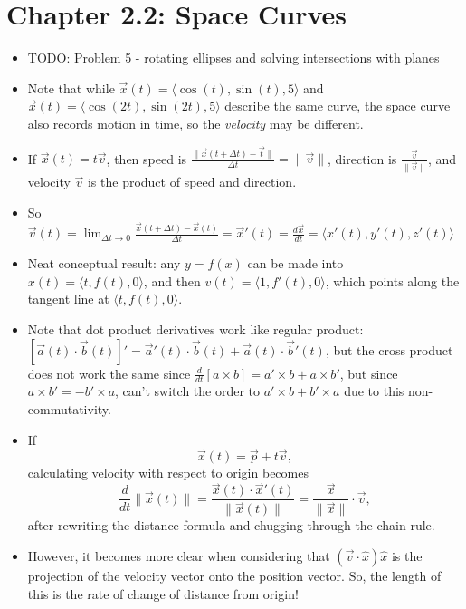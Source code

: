 \documentclass[11pt, oneside]{article}   	%
\begin{document}
\section{Chapter 2.2: Space Curves}
\begin{itemize}
\item TODO: Problem 5 - rotating ellipses and solving intersections with planes
\item Note that while $\overrightarrow{x}(t) = \langle \cos(t), \sin(t), 5 \rangle$ and  $\overrightarrow{x}(t) = \langle \cos(2t), \sin(2t), 5 \rangle$ describe the same curve, the space curve also records motion in time, so the \emph{velocity} may be different.
\item If $\overrightarrow{x}(t) = t\overrightarrow{v}$, then speed is $\frac{\| \overrightarrow{x}(t+\Delta t) - \overrightarrow{t} \|}{\Delta t} = \| \overrightarrow{v} \|$,  direction is $\frac{\overrightarrow{v}}{\| \overrightarrow{v} \|}$, and velocity $\overrightarrow{v}$ is the product of speed and direction.
\item So $\overrightarrow{v}(t) = \lim_{\Delta t \rightarrow 0} \frac{\overrightarrow{x}(t + \Delta t) - \overrightarrow{x}(t)}{\Delta t} = \overrightarrow{x}'(t) = \frac{d\overrightarrow{x}}{dt} = \langle x'(t), y'(t), z'(t) \rangle$
\item Neat conceptual result: any $y = f(x)$ can be made into $x(t) = \langle t, f(t), 0 \rangle$, and then $v(t) = \langle 1, f'(t), 0 \rangle$, which points along the tangent line at $\langle t, f(t), 0 \rangle$.
\item Note that dot product derivatives work like regular product: $[\overrightarrow{a}(t) \cdot \overrightarrow{b}(t)]' = \overrightarrow{a}'(t) \cdot \overrightarrow{b}(t) + \overrightarrow{a}(t) \cdot \overrightarrow{b}'(t)$, 
but the cross product does not work the same since $\frac{d}{dt}[a \times b] = a' \times b + a \times b'$, but since $a \times b' = -b' \times a$, can't switch the order to $a' \times b + b' \times a$ due to this non-commutativity.
\item If $$\overrightarrow{x}(t) = \overrightarrow{p}+ t \overrightarrow{v},$$ calculating velocity with respect to origin  becomes
$$ \frac{d}{dt} \| \overrightarrow{x}(t) \| = \frac{\overrightarrow{x}(t) \cdot \overrightarrow{x}'(t)}{\| \overrightarrow{x}(t) \|} = \frac{\overrightarrow{x}}{\| \overrightarrow{x} \|} \cdot \overrightarrow{v},$$ after rewriting the distance formula and chugging through the chain rule.
\item However, it becomes more clear when considering that $(\overrightarrow{v} \cdot \hat{x}) \hat{x}$ is the projection of the velocity vector onto the position vector.  So, the length of this is the rate of change of distance from origin!
\end{itemize}
\end{document}
